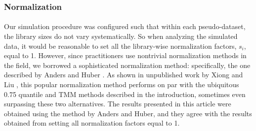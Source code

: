 \documentclass[10pt]{article}
\begin{document}
\subsubsection*{Normalization}
{
\paragraph{} \indent Our simulation procedure was configured such that within each pseudo-dataset, the library sizes do not vary systematically. So when analyzing the simulated data, it would be reasonable to set all the library-wise normalization factors, $s_i$, equal to 1. However, since practitioners use nontrivial normalization methods in the field, we borrowed a sophisticated normalization method: specifically, the one described by Anders and Huber \cite{deseq}. As shown in unpublished work by Xiong and Liu \cite{xiong}, this popular normalization method performs on par with the ubiquitous 0.75 quantile and TMM methods described in the introduction, sometimes even surpassing these two alternatives. The results presented in this article were obtained using the method by Anders and Huber, and they agree with the results obtained from setting all normalization factors equal to 1. }
\end{document}
